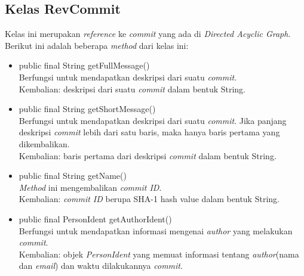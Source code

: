 \subsection{Kelas RevCommit}
\label{subsec:revcommit}
Kelas ini merupakan \textit{reference} ke \textit{commit} yang ada di \textit{Directed Acyclic Graph}. Berikut ini adalah  beberapa \textit{method} dari kelas ini:
\begin{itemize}
\item public final String getFullMessage()\\
Berfungsi untuk mendapatkan deskripsi dari suatu \textit{commit}.\\
Kembalian: deskripsi dari suatu \textit{commit} dalam bentuk String.

\item public final String getShortMessage()\\
Berfungsi untuk mendapatkan deskripsi dari suatu \textit{commit}. Jika panjang deskripsi \textit{commit} lebih dari satu baris, maka hanya baris pertama yang dikembalikan.\\
Kembalian: baris pertama dari deskripsi \textit{commit} dalam bentuk String.

\item public final String getName()\\
\textit{Method} ini mengembalikan \textit{commit ID}.\\
Kembalian: \textit{commit ID} berupa SHA-1 hash value dalam bentuk String. 

\item public final PersonIdent getAuthorIdent()\\
Berfungsi untuk mendapatkan informasi mengenai \textit{author} yang melakukan \textit{commit}.\\
Kembalian: objek \textit{PersonIdent} yang memuat informasi tentang \textit{author}(nama dan \textit{email}) dan waktu dilakukannya \textit{commit}.
\end{itemize}

